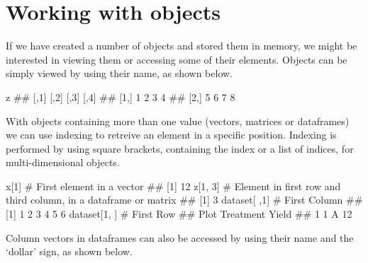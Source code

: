 \documentclass[a4paper,12pt,oneside]{book}
\newenvironment{Shaded}{\begin{snugshade}}{\end{snugshade}}
\newcommand{\DecValTok}[1]{#1}
\newcommand{\SpecialCharTok}[1]{#1}
\newcommand{\CommentTok}[1]{#1}
\newcommand{\DocumentationTok}[1]{#1}
\newcommand{\NormalTok}[1]{#1}
\begin{document}
\normalsize

\hypertarget{working-with-objects}{%
\section{Working with objects}\label{working-with-objects}}

If we have created a number of objects and stored them in memory, we might be interested in viewing them or accessing some of their elements. Objects can be simply viewed by using their name, as shown below.

\begin{Shaded}
\begin{Highlighting}[]
\NormalTok{z}
\DocumentationTok{\#\#      [,1] [,2] [,3] [,4]}
\DocumentationTok{\#\# [1,]    1    2    3    4}
\DocumentationTok{\#\# [2,]    5    6    7    8}
\end{Highlighting}
\end{Shaded}

With objects containing more than one value (vectors, matrices or dataframes) we can use indexing to retreive an element in a specific position. Indexing is performed by using square brackets, containing the index or a list of indices, for multi-dimensional objects.

\begin{Shaded}
\begin{Highlighting}[]
\NormalTok{x[}\DecValTok{1}\NormalTok{] }\CommentTok{\# First element in a vector}
\DocumentationTok{\#\# [1] 12}
\NormalTok{z[}\DecValTok{1}\NormalTok{, }\DecValTok{3}\NormalTok{] }\CommentTok{\# Element in first row and third column, in a dataframe or matrix}
\DocumentationTok{\#\# [1] 3}
\NormalTok{dataset[ ,}\DecValTok{1}\NormalTok{] }\CommentTok{\# First Column}
\DocumentationTok{\#\# [1] 1 2 3 4 5 6}
\NormalTok{dataset[}\DecValTok{1}\NormalTok{, ] }\CommentTok{\# First Row}
\DocumentationTok{\#\#   Plot Treatment Yield}
\DocumentationTok{\#\# 1    1         A    12}
\end{Highlighting}
\end{Shaded}

Column vectors in dataframes can also be accessed by using their name and the `dollar' sign, as shown below.

\begin{Shaded}
\end{Shaded}
\end{document}

